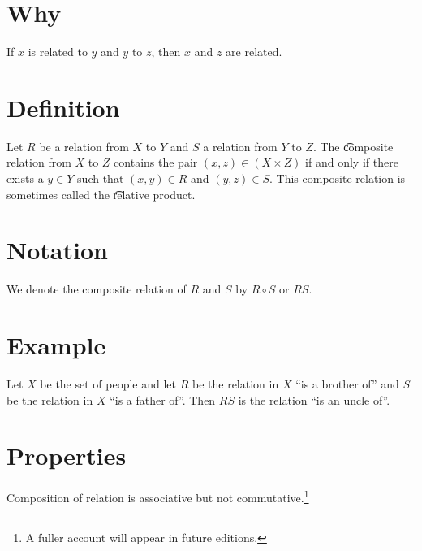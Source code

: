 

\section*{Why}

If $x$ is related to $y$ and $y$ to $z$, then $x$ and $z$ are related.

\section*{Definition}

Let $R$ be a relation from $X$ to $Y$ and $S$ a relation from $Y$ to $Z$.
The \t{composite relation} from $X$ to $Z$ contains the pair $(x, z) \in (X \times  Z)$ if and only if there exists a $y \in Y$ such that $(x, y) \in R$ and $(y,z) \in S$.
This composite relation is sometimes called the \t{relative product}.

\section*{Notation}

We denote the composite relation of $R$ and $S$ by $R \circ S$ or $RS$.

\section*{Example}

Let $X$ be the set of people and let $R$ be the relation in $X$ ``is a brother of'' and $S$ be the relation in $X$ ``is a father of''.
Then $RS$ is the relation ``is an uncle of''.

\section*{Properties}

Composition of relation is associative but not commutative.\footnote{A fuller account will appear in future editions.}


\blankpage